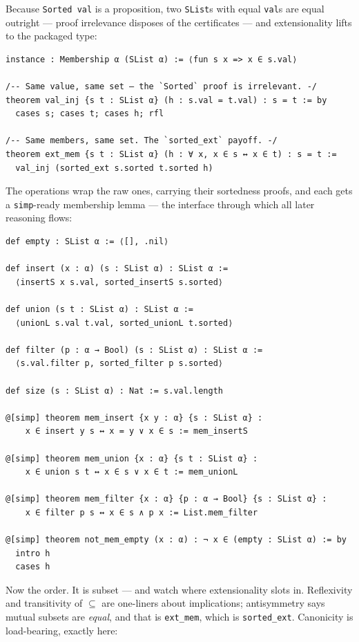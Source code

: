 \documentclass[12pt, a4paper, openright]{book}
\theoremstyle{thmstyle}
\theoremstyle{defstyle}
\newcommand{\lc}[1]{\texttt{#1}}
\begin{document}
Because \lc{Sorted val} is a proposition, two \lc{SList}s with equal
\lc{val}s are equal outright --- proof irrelevance disposes of the
certificates --- and extensionality lifts to the packaged type:

\begin{verbatim}
instance : Membership α (SList α) := ⟨fun s x => x ∈ s.val⟩

/-- Same value, same set — the `Sorted` proof is irrelevant. -/
theorem val_inj {s t : SList α} (h : s.val = t.val) : s = t := by
  cases s; cases t; cases h; rfl

/-- Same members, same set. The `sorted_ext` payoff. -/
theorem ext_mem {s t : SList α} (h : ∀ x, x ∈ s ↔ x ∈ t) : s = t :=
  val_inj (sorted_ext s.sorted t.sorted h)
\end{verbatim}

The operations wrap the raw ones, carrying their sortedness proofs, and
each gets a \lc{simp}-ready membership lemma --- the interface through
which all later reasoning flows:

\begin{verbatim}
def empty : SList α := ⟨[], .nil⟩

def insert (x : α) (s : SList α) : SList α :=
  ⟨insertS x s.val, sorted_insertS s.sorted⟩

def union (s t : SList α) : SList α :=
  ⟨unionL s.val t.val, sorted_unionL t.sorted⟩

def filter (p : α → Bool) (s : SList α) : SList α :=
  ⟨s.val.filter p, sorted_filter p s.sorted⟩

def size (s : SList α) : Nat := s.val.length

@[simp] theorem mem_insert {x y : α} {s : SList α} :
    x ∈ insert y s ↔ x = y ∨ x ∈ s := mem_insertS

@[simp] theorem mem_union {x : α} {s t : SList α} :
    x ∈ union s t ↔ x ∈ s ∨ x ∈ t := mem_unionL

@[simp] theorem mem_filter {x : α} {p : α → Bool} {s : SList α} :
    x ∈ filter p s ↔ x ∈ s ∧ p x := List.mem_filter

@[simp] theorem not_mem_empty (x : α) : ¬ x ∈ (empty : SList α) := by
  intro h
  cases h
\end{verbatim}

Now the order. It is subset --- and watch where extensionality slots in.
Reflexivity and transitivity of $\subseteq$ are one-liners about
implications; antisymmetry says mutual subsets are \emph{equal}, and
that is \lc{ext_mem}, which is \lc{sorted_ext}. Canonicity is
load-bearing, exactly here:
\end{document}
